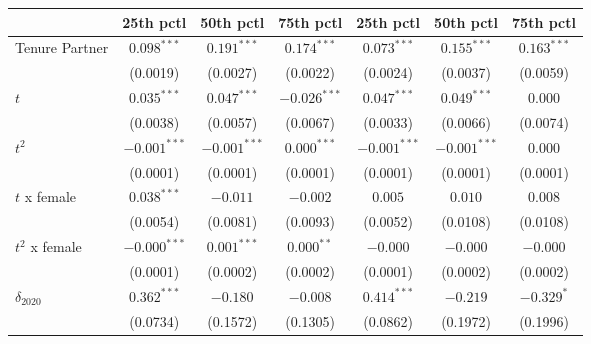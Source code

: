 \begin{tabular}{l|ccc|ccc}
\toprule
{} &       25th pctl &       50th pctl &       75th pctl &              25th pctl &       50th pctl &       75th pctl \\
\midrule
Tenure Partner                         &   $0.098^{***}$ &   $0.191^{***}$ &   $0.174^{***}$ &          $0.073^{***}$ &   $0.155^{***}$ &   $0.163^{***}$ \\
                                       &        (0.0019) &        (0.0027) &        (0.0022) &               (0.0024) &        (0.0037) &        (0.0059) \\
$t$                                    &   $0.035^{***}$ &   $0.047^{***}$ &  $-0.026^{***}$ &          $0.047^{***}$ &   $0.049^{***}$ &         $0.000$ \\
                                       &        (0.0038) &        (0.0057) &        (0.0067) &               (0.0033) &        (0.0066) &        (0.0074) \\
$t^2$                                  &  $-0.001^{***}$ &  $-0.001^{***}$ &   $0.000^{***}$ &         $-0.001^{***}$ &  $-0.001^{***}$ &         $0.000$ \\
                                       &        (0.0001) &        (0.0001) &        (0.0001) &               (0.0001) &        (0.0001) &        (0.0001) \\
$t$ x female                           &   $0.038^{***}$ &        $-0.011$ &        $-0.002$ &                $0.005$ &         $0.010$ &         $0.008$ \\
                                       &        (0.0054) &        (0.0081) &        (0.0093) &               (0.0052) &        (0.0108) &        (0.0108) \\
$t^2$ x female                         &  $-0.000^{***}$ &   $0.001^{***}$ &    $0.000^{**}$ &               $-0.000$ &        $-0.000$ &        $-0.000$ \\
                                       &        (0.0001) &        (0.0002) &        (0.0002) &               (0.0001) &        (0.0002) &        (0.0002) \\
$\delta_{2020}$                        &   $0.362^{***}$ &        $-0.180$ &        $-0.008$ &          $0.414^{***}$ &        $-0.219$ &      $-0.329^*$ \\
                                       &        (0.0734) &        (0.1572) &        (0.1305) &               (0.0862) &        (0.1972) &        (0.1996) \\

\end{tabular}
